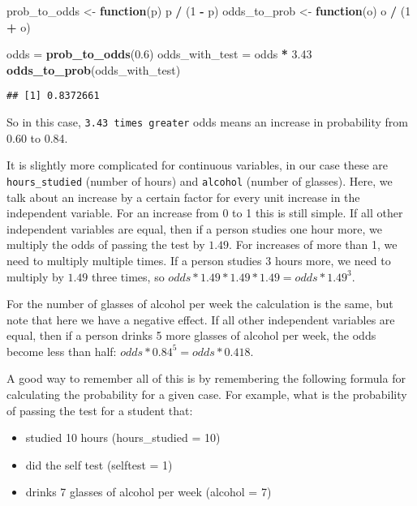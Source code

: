\documentclass[
]{article}
\newenvironment{Shaded}{\begin{snugshade}}{\end{snugshade}}
\newcommand{\ControlFlowTok}[1]{\textcolor[rgb]{0.13,0.29,0.53}{\textbf{#1}}}
\newcommand{\DecValTok}[1]{\textcolor[rgb]{0.00,0.00,0.81}{#1}}
\newcommand{\FloatTok}[1]{\textcolor[rgb]{0.00,0.00,0.81}{#1}}
\newcommand{\KeywordTok}[1]{\textcolor[rgb]{0.13,0.29,0.53}{\textbf{#1}}}
\newcommand{\NormalTok}[1]{#1}
\newcommand{\OperatorTok}[1]{\textcolor[rgb]{0.81,0.36,0.00}{\textbf{#1}}}
\newcommand{\StringTok}[1]{\textcolor[rgb]{0.31,0.60,0.02}{#1}}
\providecommand{\tightlist}{%
  \setlength{\itemsep}{0pt}\setlength{\parskip}{0pt}}
\begin{document}
\begin{Shaded}
\begin{Highlighting}[]
\NormalTok{prob_to_odds <-}\StringTok{ }\ControlFlowTok{function}\NormalTok{(p) p }\OperatorTok{/}\StringTok{ }\NormalTok{(}\DecValTok{1} \OperatorTok{-}\StringTok{ }\NormalTok{p)}
\NormalTok{odds_to_prob <-}\StringTok{ }\ControlFlowTok{function}\NormalTok{(o) o }\OperatorTok{/}\StringTok{ }\NormalTok{(}\DecValTok{1} \OperatorTok{+}\StringTok{ }\NormalTok{o)}

\NormalTok{odds =}\StringTok{ }\KeywordTok{prob_to_odds}\NormalTok{(}\FloatTok{0.6}\NormalTok{)}
\NormalTok{odds_with_test =}\StringTok{ }\NormalTok{odds }\OperatorTok{*}\StringTok{ }\FloatTok{3.43}
\KeywordTok{odds_to_prob}\NormalTok{(odds_with_test)}
\end{Highlighting}
\end{Shaded}

\begin{verbatim}
## [1] 0.8372661
\end{verbatim}

So in this case, \texttt{3.43\ times\ greater} odds means an increase in
probability from 0.60 to 0.84.

It is slightly more complicated for continuous variables, in our case
these are \texttt{hours\_studied} (number of hours) and \texttt{alcohol}
(number of glasses). Here, we talk about an increase by a certain factor
for every unit increase in the independent variable. For an increase
from 0 to 1 this is still simple. If all other independent variables are
equal, then if a person studies one hour more, we multiply the odds of
passing the test by \(1.49\). For increases of more than 1, we need to
multiply multiple times. If a person studies 3 hours more, we need to
multiply by \(1.49\) three times, so
\(odds * 1.49 * 1.49 * 1.49 = odds * 1.49^3\).

For the number of glasses of alcohol per week the calculation is the
same, but note that here we have a negative effect. If all other
independent variables are equal, then if a person drinks 5 more glasses
of alcohol per week, the odds become less than half:
\(odds * 0.84^5 = odds * 0.418\).

A good way to remember all of this is by remembering the following
formula for calculating the probability for a given case. For example,
what is the probability of passing the test for a student that:

\begin{itemize}
\tightlist
\item
  studied 10 hours (hours\_studied = 10)
\item
  did the self test (selftest = 1)
\item
  drinks 7 glasses of alcohol per week (alcohol = 7)
\end{itemize}
\end{document}
